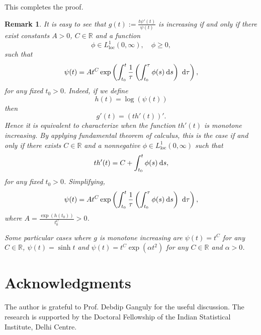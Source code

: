 \documentclass[a4paper,11pt,reqno]{amsart}
\theoremstyle{plain}
\newtheorem{remark}{Remark}[section]
\numberwithin{equation}{section} \allowdisplaybreaks
\newcommand{\ds}{\:{\rm d}s}
\begin{document}
This completes the proof.


\begin{remark}\label{final remark}
\rm
    It is easy to see that $g(t):=\frac{t\psi'(t)}{\psi(t)}$ is increasing if and only if there exist constants $A>0$, $C\in \mathbb{R}$ and a function
    \begin{equation*}
        \phi\in L^1_{\text{loc}}(0,\infty),\quad \phi\geq 0,
    \end{equation*}
    such that
    \begin{equation*}
        \psi(t)=At^C\exp\left(\int_{t_0}^t\frac{1}{\tau}\left(\int_{t_0}^\tau \phi(s)\ds\right)\ \mathrm{d}\tau\right),
    \end{equation*}
    for any fixed $t_0>0$. Indeed, if we define 
    \begin{equation*}
        h(t)=\log(\psi(t))
    \end{equation*}
    then 
    \begin{equation*}
        g'(t)=(th'(t))'.
    \end{equation*}
    Hence it is equivalent to characterize when the function $th'(t)$ is monotone increasing. By applying fundamental theorem of calculus, this is the case if and only if there exists $C\in \mathbb{R}$ and a nonnegative $\phi\in L^1_{\text{{loc}}}(0,\infty)$ such that
    \begin{equation*}
        th'(t)=C+\int_{t_0}^t\phi(s)\ds,
    \end{equation*}
    for any fixed $t_0>0$. Simplifying,
    \begin{equation*}
        \psi(t)=At^C\exp\left(\int_{t_0}^t\frac{1}{\tau}\left(\int_{t_0}^\tau \phi(s)\ds\right)\ \mathrm{d}\tau\right),
    \end{equation*}
    where $A=\frac{\exp (h(t_0))}{t_0^C}>0$. 
    
    Some particular cases where $g$ is monotone increasing are $\psi(t)=t^C$ for any $C\in \mathbb{R}$, $\psi(t)=\sinh t$ and $\psi(t)=t^C\exp(\alpha t^2)$ for any $C \in \mathbb{R}$ and $\alpha>0$.
    \rm
\end{remark}









\section*{Acknowledgments} 
The author is grateful to Prof. Debdip Ganguly for the useful discussion. The research is supported by the Doctoral Fellowship of the Indian Statistical Institute, Delhi Centre. 
\end{document}
